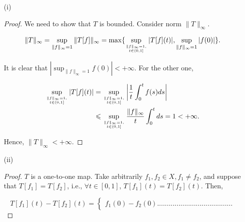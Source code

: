 \documentclass[12pt]{article}
\begin{document}
\begin{enumerate}

\item [(i)]

\begin{proof}

We need to show that $T$ is bounded. Consider norm $\|T\|_\infty$.

$$
\begin{aligned}
\|T\|_\infty = \sup_{\|f\|_\infty = 1} \|T[f]\|_\infty = \max \{  \sup_{\|f\|_\infty = 1,\atop t\in(0, 1]}|T[f](t)|, \sup_{\|f\|_\infty = 1} |f(0)| \}.
\end{aligned}
$$

It is clear that $|\sup_{\|f\|_\infty = 1}f(0)| <+\infty$. For the other one, 

$$
\begin{aligned}
\sup_{\|f\|_\infty = 1,\atop t\in(0, 1]}|T[f](t)| & = \sup_{\|f\|_\infty = 1,\atop t\in(0, 1]} \left|\frac{1}{t}\int_0^t f(s) ds\right|\\
& \leqslant \sup_{\|f\|_\infty = 1,\atop t\in(0, 1]} \frac{\|f\|_\infty}{t}\int_0^t ds = 1 < +\infty.
\end{aligned}
$$

Hence, $\|T\|_\infty < +\infty$. 

\end{proof}

\item [(ii)]

\begin{proof}

$T$ is a one-to-one map. Take arbitrarily $f_1, f_2\in X, f_1 \neq f_2$, and suppose that $T[f_1] = T[f_2]$, i.e., $\forall t\in[0, 1]$, $T[f_1](t) = T[f_2](t)$. Then,

$$
T[f_1](t) - T[f_2](t) = \left\{
\begin{aligned}
f_1(0) - f_2(0).......................................
\end{aligned}
\right.
$$ 

\end{proof}



\end{enumerate}
\end{document}
